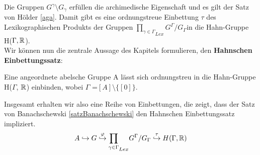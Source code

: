Die Gruppen $G^\gamma \setminus G_\gamma$ erfüllen die archimedische Eigenschaft und es gilt der Satz von Hölder \ref{aga}. Damit gibt es eine ordnungstreue Einbettung $\tau$ des Lexikographischen Produkts der Gruppen ${\prod_{\gamma \in \Gamma}}_{Lex} G^\Gamma/ G_\Gamma$in die Hahn-Gruppe H($\Gamma, \mathbb{R}$).\\
Wir können nun die zentrale Aussage des Kapitels formulieren, den \textbf{Hahnschen Einbettungssatz}:
\begin{satz} \label{hebs} %
Eine angeordnete abelsche Gruppe A lässt sich ordnungstreu in die Hahn-Gruppe H($ \Gamma $, $ \mathbb{R} $) einbinden, wobei $ \Gamma$ =$ [A]\setminus \{[0]\} $.
\end{satz}
Insgesamt erhalten wir also eine Reihe von Einbettungen, die zeigt, dass der Satz von Banachschewski \ref{satzBanachschewski} den Hahnschen Einbettungssatz impliziert.\\
\[A \hookrightarrow G \stackrel{\mathrm{\varphi}}\hookrightarrow {\prod_{\gamma \in \Gamma}}_{Lex} G^\Gamma/ G_\Gamma \stackrel{\mathrm{\tau}}\hookrightarrow H(\Gamma, \mathbb{R})\]
%
